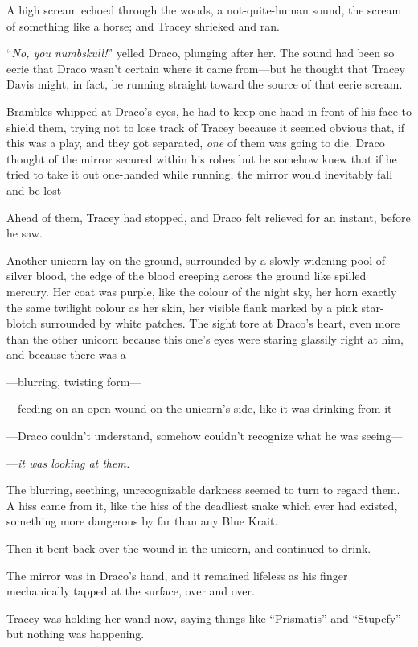 A high scream echoed through the woods, a not-quite-human sound, the scream of something like a horse; and Tracey shrieked and ran.

“\emph{No, you numbskull!}” yelled Draco, plunging after her. The sound had been so eerie that Draco wasn’t certain where it came from—but he thought that Tracey Davis might, in fact, be running straight toward the source of that eerie scream.

Brambles whipped at Draco’s eyes, he had to keep one hand in front of his face to shield them, trying not to lose track of Tracey because it seemed obvious that, if this was a play, and they got separated, \emph{one} of them was going to die. Draco thought of the mirror secured within his robes but he somehow knew that if he tried to take it out one-handed while running, the mirror would inevitably fall and be lost—

Ahead of them, Tracey had stopped, and Draco felt relieved for an instant, before he saw.

Another unicorn lay on the ground, surrounded by a slowly widening pool of silver blood, the edge of the blood creeping across the ground like spilled mercury. Her coat was purple, like the colour of the night sky, her horn exactly the same twilight colour as her skin, her visible flank marked by a pink star-blotch surrounded by white patches. The sight tore at Draco’s heart, even more than the other unicorn because this one’s eyes were staring glassily right at him, and because there was a—

—blurring, twisting form—

—feeding on an open wound on the unicorn’s side, like it was drinking from it—

—Draco couldn’t understand, somehow couldn’t recognize what he was seeing—

—\emph{it was looking at them.}

The blurring, seething, unrecognizable darkness seemed to turn to regard them. A hiss came from it, like the hiss of the deadliest snake which ever had existed, something more dangerous by far than any Blue Krait.

Then it bent back over the wound in the unicorn, and continued to drink.

The mirror was in Draco’s hand, and it remained lifeless as his finger mechanically tapped at the surface, over and over.

Tracey was holding her wand now, saying things like “Prismatis” and “Stupefy” but nothing was happening.

